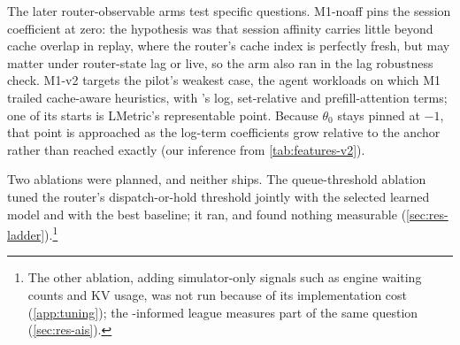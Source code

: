 The later router-observable arms test specific questions. M1-noaff pins the session coefficient at
zero: the hypothesis was that session affinity carries little beyond cache overlap in
replay, where the router's cache index is perfectly fresh, but may matter under router-state lag
or live, so the arm also ran in the lag robustness check. M1-v2 targets the pilot's weakest case,
the agent workloads on which M1 trailed cache-aware heuristics, with 's log, set-relative
and prefill-attention terms; one of its starts is LMetric's representable point. Because $\theta_0$
stays pinned at $-1$, that point is approached as the log-term coefficients grow relative to the
anchor rather than reached exactly (our inference from \cref{tab:features-v2}).

\label{sec:ablations}
Two ablations were planned, and neither ships. The queue-threshold ablation tuned the router's
dispatch-or-hold threshold  jointly with the selected learned model
and with the best baseline; it ran, and found nothing measurable
(\cref{sec:res-ladder}).\footnote{The other ablation, adding simulator-only signals such as engine
  waiting counts and KV usage, was not run because of its implementation cost (\cref{app:tuning}); the
  \ais{}-informed league measures part of the same question (\cref{sec:res-ais}).}
